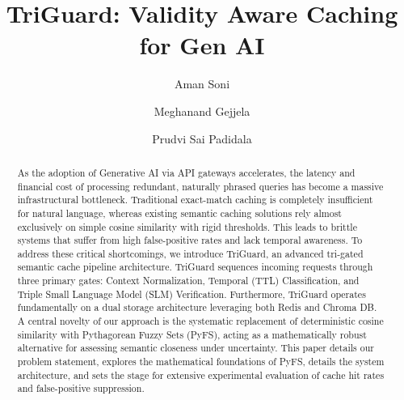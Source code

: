 \documentclass[sigconf]{acmart}
\begin{document}
\title{TriGuard: Validity Aware Caching for Gen AI}

\author{Aman Soni}

\author{Meghanand Gejjela}

\author{Prudvi Sai Padidala}

\renewcommand{\shortauthors}{Soni, Gejjela, and Padidala}

\begin{abstract}
As the adoption of Generative AI via API gateways accelerates, the latency and financial cost of processing redundant, naturally phrased queries has become a massive infrastructural bottleneck. Traditional exact-match caching is completely insufficient for natural language, whereas existing semantic caching solutions rely almost exclusively on simple cosine similarity with rigid thresholds. This leads to brittle systems that suffer from high false-positive rates and lack temporal awareness. To address these critical shortcomings, we introduce TriGuard, an advanced tri-gated semantic cache pipeline architecture. TriGuard sequences incoming requests through three primary gates: Context Normalization, Temporal (TTL) Classification, and Triple Small Language Model (SLM) Verification. Furthermore, TriGuard operates fundamentally on a dual storage architecture leveraging both Redis and Chroma DB. A central novelty of our approach is the systematic replacement of deterministic cosine similarity with Pythagorean Fuzzy Sets (PyFS), acting as a mathematically robust alternative for assessing semantic closeness under uncertainty. This paper details our problem statement, explores the mathematical foundations of PyFS, details the system architecture, and sets the stage for extensive experimental evaluation of cache hit rates and false-positive suppression.
\end{abstract}


\maketitle
\end{document}
